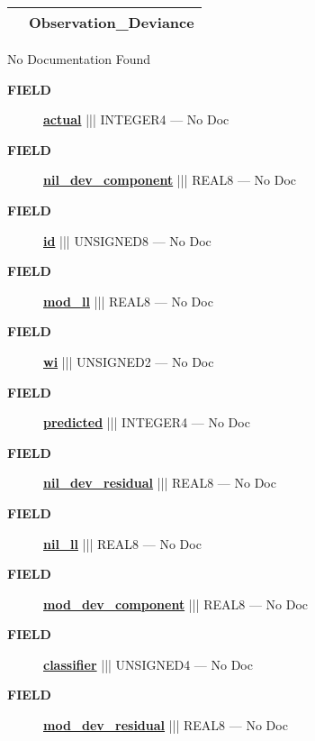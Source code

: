 {\renewcommand{\arraystretch}{1.5}
\begin{tabularx}{\textwidth}{|>{\raggedright\arraybackslash}l|X|}
\hline
\hspace{0pt}\mytexttt{\color{red} } & \textbf{Observation\_Deviance} \\
\hline
\end{tabularx}
}

\par





No Documentation Found







\par
\begin{description}
\item [\colorbox{tagtype}{\color{white} \textbf{\textsf{FIELD}}}] \textbf{\underline{actual}} ||| INTEGER4 --- No Doc
\item [\colorbox{tagtype}{\color{white} \textbf{\textsf{FIELD}}}] \textbf{\underline{nil\_dev\_component}} ||| REAL8 --- No Doc
\item [\colorbox{tagtype}{\color{white} \textbf{\textsf{FIELD}}}] \textbf{\underline{id}} ||| UNSIGNED8 --- No Doc
\item [\colorbox{tagtype}{\color{white} \textbf{\textsf{FIELD}}}] \textbf{\underline{mod\_ll}} ||| REAL8 --- No Doc
\item [\colorbox{tagtype}{\color{white} \textbf{\textsf{FIELD}}}] \textbf{\underline{wi}} ||| UNSIGNED2 --- No Doc
\item [\colorbox{tagtype}{\color{white} \textbf{\textsf{FIELD}}}] \textbf{\underline{predicted}} ||| INTEGER4 --- No Doc
\item [\colorbox{tagtype}{\color{white} \textbf{\textsf{FIELD}}}] \textbf{\underline{nil\_dev\_residual}} ||| REAL8 --- No Doc
\item [\colorbox{tagtype}{\color{white} \textbf{\textsf{FIELD}}}] \textbf{\underline{nil\_ll}} ||| REAL8 --- No Doc
\item [\colorbox{tagtype}{\color{white} \textbf{\textsf{FIELD}}}] \textbf{\underline{mod\_dev\_component}} ||| REAL8 --- No Doc
\item [\colorbox{tagtype}{\color{white} \textbf{\textsf{FIELD}}}] \textbf{\underline{classifier}} ||| UNSIGNED4 --- No Doc
\item [\colorbox{tagtype}{\color{white} \textbf{\textsf{FIELD}}}] \textbf{\underline{mod\_dev\_residual}} ||| REAL8 --- No Doc
\end{description}





